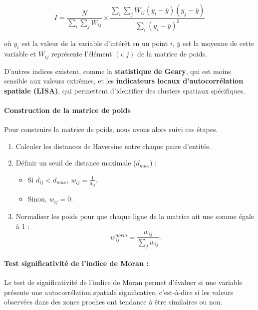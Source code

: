 \documentclass[
]{article}
\providecommand{\tightlist}{%
  \setlength{\itemsep}{0pt}\setlength{\parskip}{0pt}}
\begin{document}
\[
I = \frac{N}{\sum_{i} \sum_{j} W_{ij}} \times \frac{\sum_{i} \sum_{j} W_{ij} (y_i - \bar{y})(y_j - \bar{y})}{\sum_{i} (y_i - \bar{y})^2}
\]

où \(y_i\) est la valeur de la variable d'intérêt en un point \(i\),
\(\bar{y}\) est la moyenne de cette variable et \(W_{ij}\) représente
l'élément \((i, j)\) de la matrice de poids.

D'autres indices existent, comme la \textbf{statistique de Geary}, qui
est moins sensible aux valeurs extrêmes, et les
\textbf{indicateurs locaux d'autocorrélation spatiale (LISA)}, qui
permettent d'identifier des clusters spatiaux spécifiques.

\hypertarget{construction-de-la-matrice-de-poids}{%
\paragraph{Construction de la matrice de
poids}\label{construction-de-la-matrice-de-poids}}

\hfill\break
Pour construire la matrice de poids, nous avons alors suivi ces
étapes.\\

\begin{enumerate}
\def\labelenumi{\arabic{enumi}.}
\tightlist
\item
  Calculer les distances de Haversine entre chaque paire d'entités.
\item
  Définir un seuil de distance maximale (\(d_{max}\)) :

  \begin{itemize}
  \tightlist
  \item
    Si \(d_{ij} < d_{max}\), \(w_{ij} = \frac{1}{d_{ij}}\).
  \item
    Sinon, \(w_{ij} = 0\).
  \end{itemize}
\item
  Normaliser les poids pour que chaque ligne de la matrice ait une somme
  égale à 1 : \[
   w_{ij}^{norm} = \frac{w_{ij}}{\sum_{j} w_{ij}}.
  \]
\end{enumerate}

\hypertarget{test-significativituxe9-de-lindice-de-moran}{%
\paragraph{Test significativité de l'indice de Moran
:}\label{test-significativituxe9-de-lindice-de-moran}}

Le test de significativité de l'indice de Moran permet d'évaluer si une
variable présente une autocorrélation spatiale significative,
c'est-à-dire si les valeurs observées dans des zones proches ont
tendance à être similaires ou non.
\end{document}
